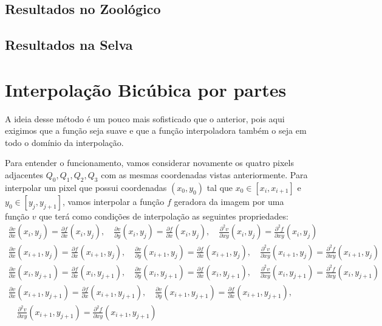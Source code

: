 \documentclass{article}
\begin{document}
		\subsection{Resultados no Zoológico}
		\subsection{Resultados na Selva}
	\section{Interpolação Bicúbica por partes}
	A ideia desse método é um pouco mais sofisticado que o anterior, pois aqui exigimos que a função seja suave e que a função interpoladora também o seja em todo o domínio da interpolação. \par
	Para entender o funcionamento, vamos considerar novamente os quatro pixels adjacentes $Q_{0}, Q_{1}, Q_{2}, Q_{3}$ com as mesmas coordenadas vistas anteriormente. Para interpolar um pixel que possui coordenadas $(x_{0}, y_{0})$ tal que $x_{0} \in [x_{i}, x_{i+1}]$ e $y_{0} \in [y_{j}, y_{j+1}]$, vamos interpolar a função $f$ geradora da imagem por uma função $v$ que terá como condições de interpolação as seguintes propriedades:
	\[
		\begin{array}{llllc}
		\frac{\partial v}{\partial x}(x_{i}, y_{j}) = \frac{\partial f}{\partial x}(x_{i}, y_{j}), \quad \frac{\partial v}{\partial y}(x_{i}, y_{j}) = \frac{\partial f}{\partial x}(x_{i}, y_{j}), \quad \frac{\partial^2 v}{\partial xy}(x_{i}, y_{j}) = \frac{\partial^2 f}{\partial xy}(x_{i}, y_{j})\\
		
		\frac{\partial v}{\partial x}(x_{i+1}, y_{j}) = \frac{\partial f}{\partial x}(x_{i+1}, y_{j}), \quad \frac{\partial v}{\partial y}(x_{i+1}, y_{j}) = \frac{\partial f}{\partial x}(x_{i+1}, y_{j}), \quad \frac{\partial^2 v}{\partial xy}(x_{i+1}, y_{j}) = \frac{\partial^2 f}{\partial xy}(x_{i+1}, y_{j}) \\
		
		\frac{\partial v}{\partial x}(x_{i}, y_{j+1}) = \frac{\partial f}{\partial x}(x_{i}, y_{j+1}), \quad \frac{\partial v}{\partial y}(x_{i}, y_{j+1}) = \frac{\partial f}{\partial x}(x_{i}, y_{j+1}), \quad \frac{\partial^2 v}{\partial xy}(x_{i}, y_{j+1}) = \frac{\partial^2 f}{\partial xy}(x_{i}, y_{j+1}) \\
				
		\frac{\partial v}{\partial x}(x_{i+1}, y_{j+1}) = \frac{\partial f}{\partial x}(x_{i+1}, y_{j+1}), \quad \frac{\partial v}{\partial y}(x_{i+1}, y_{j+1}) = \frac{\partial f}{\partial x}(x_{i+1}, y_{j+1}), \\ \quad \frac{\partial^2 v}{\partial xy}(x_{i+1}, y_{j+1}) = \frac{\partial^2 f}{\partial xy}(x_{i+1}, y_{j+1})
		\end{array}
	\]
\end{document}
